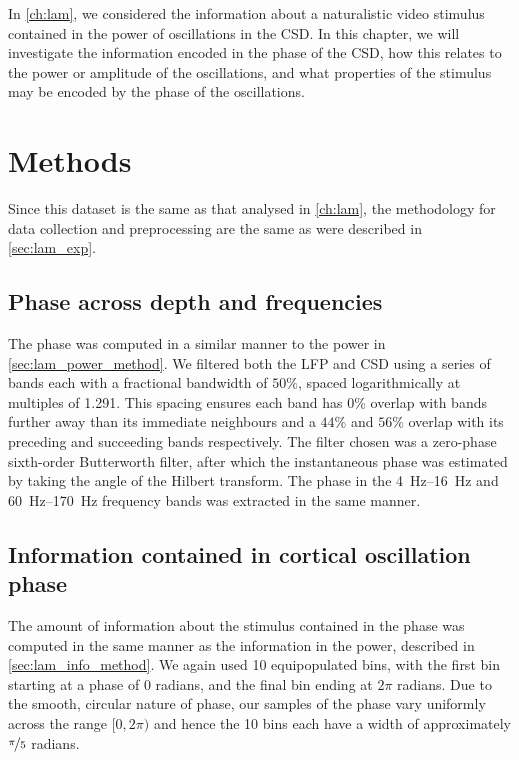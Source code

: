 
In \autoref{ch:lam}, we considered the information about a naturalistic video stimulus contained in the power of oscillations in the \ac{CSD}.
In this chapter, we will investigate the information encoded in the phase of the \ac{CSD}, how this relates to the power or amplitude of the oscillations, and what properties of the stimulus may be encoded by the phase of the oscillations.


\section{Methods}

Since this dataset is the same as that analysed in \autoref{ch:lam}, the methodology for data collection and preprocessing are the same as were described in \autoref{sec:lam_exp}.


\subsection{Phase across depth and frequencies}
\label{sec:lam_phase_method}

The phase was computed in a similar manner to the power in \autoref{sec:lam_power_method}.
We filtered both the \ac{LFP} and \ac{CSD} using a series of bands each with a fractional bandwidth of $50\%$, spaced logarithmically at multiples of \num{1.291}.
This spacing ensures each band has $0\%$ overlap with bands further away than its immediate neighbours and a $44\%$ and $56\%$ overlap with its preceding and succeeding bands respectively.
The filter chosen was a zero-phase sixth-order Butterworth filter, after which the instantaneous phase was estimated by taking the angle of the Hilbert transform.
The phase in the \SIrange{4}{16}{Hz} and \SIrange{60}{170}{Hz} frequency bands was extracted in the same manner.


\subsection{Information contained in cortical oscillation phase}

The amount of information about the stimulus contained in the phase was computed in the same manner as the information in the power, described in \autoref{sec:lam_info_method}.
We again used \num{10} equipopulated bins, with the first bin starting at a phase of $0$ radians, and the final bin ending at $2\pi$ radians.
Due to the smooth, circular nature of phase, our samples of the phase vary uniformly across the range $[0, 2\pi)$ and hence the \num{10} bins each have a width of approximately $\nicefrac{\pi}{5}$ radians.

